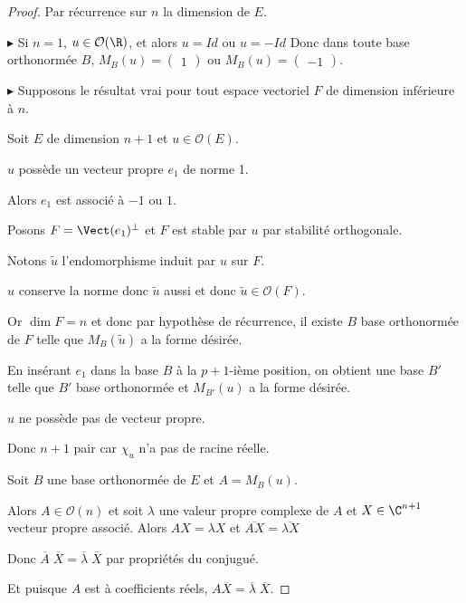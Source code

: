 \begin{proof}
    Par récurrence sur $n$ la dimension de $E$. 

    $\blacktriangleright$ Si $n = 1$, $u \in \mathcal O(\R)$, et alors $u = Id$ ou $u = - Id$
    Donc dans toute base orthonormée $B$, $M_B(u) = \begin{pmatrix}
        1
    \end{pmatrix}$ ou $M_B(u) = \begin{pmatrix}
        -1
    \end{pmatrix}$.

    \avspace $\blacktriangleright$ Supposons le résultat vrai pour tout espace vectoriel $F$ de 
    dimension inférieure à $n$. 

    Soit $E$ de dimension $n + 1$ et $u \in \mathcal O(E)$.

     $u$ possède un vecteur propre $e_1$ de norme 1. 

    \svspace Alors $e_1$ est associé à $-1$ ou $1$. 

    Posons $F = \Vect(e_1)^\perp$ et $F$ est stable par $u$ par stabilité orthogonale.

    Notons $\tilde u$ l'endomorphisme induit par $u$ sur $F$. 

    $u$ conserve la norme donc $\tilde u$ aussi et donc $\tilde u \in \mathcal O(F)$.

    Or $\dim F = n$ et donc par hypothèse de récurrence, 
    il existe $B$ base orthonormée de $F$ telle que $M_B(\tilde u)$ a la forme désirée. 

    En insérant $e_1$ dans la base $B$ à la $p + 1$-ième position, on obtient une base 
    $B'$ telle que $B'$ base orthonormée et $M_{B'}(u)$ a la forme désirée.

     $u$ ne possède pas de vecteur propre.

    Donc $n + 1$ pair car $\chi_u$ n'a pas de racine réelle. 

    Soit $B$ une base orthonormée de $E$ et $A = M_B(u)$. 

    Alors $A \in \mathcal O(n)$ et soit $\lambda$ une valeur propre complexe de $A$ et $X \in \C^{n + 1}$ vecteur 
    propre associé. Alors $AX = \lambda X$ et $\overline{AX} = \overline{\lambda X}$
    
    Donc $\overline A \; \overline X = \overline \lambda \; \overline X$ par propriétés du conjugué. 
    
    Et puisque $A$ est à coefficients réels, $A \overline X = \overline \lambda \; \overline X$. 


\end{proof}
